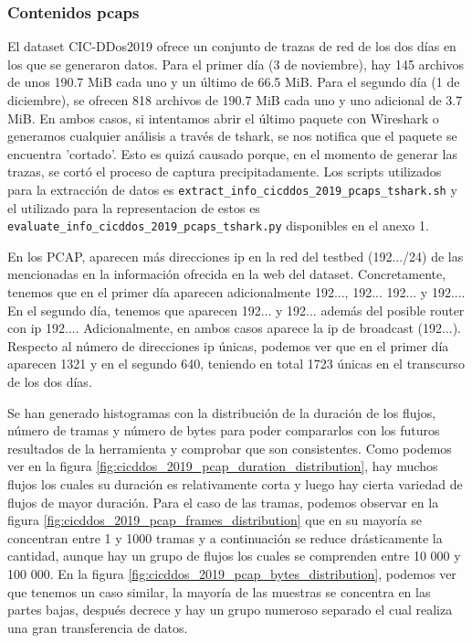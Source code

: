 \subsubsection{Contenidos pcaps}

El dataset CIC-DDos2019 ofrece un conjunto de trazas de red de los dos días en los que se generaron datos. Para el primer día (3 de noviembre), hay 145 archivos de unos 190.7 MiB cada uno y un último de 66.5 MiB. Para el segundo día (1 de diciembre), se ofrecen 818 archivos de 190.7 MiB cada uno y uno adicional de 3.7 MiB. En ambos casos, si intentamos abrir el último paquete con Wireshark o generamos cualquier análisis a través de tshark, se nos notifica que el paquete se encuentra 'cortado'. Esto es quizá causado porque, en el momento de generar las trazas, se cortó el proceso de captura precipitadamente. Los scripts utilizados para la extracción de datos es \texttt{extract\_info\_cicddos\_2019\_pcaps\_tshark.sh} y el utilizado para la representacion de estos es \texttt{evaluate\_info\_cicddos\_2019\_pcaps\_tshark.py} disponibles en el anexo 1.

En los PCAP, aparecen más direcciones \acrshort{ip} en la red del testbed (192.../24) de las mencionadas en la información ofrecida en la web del dataset. Concretamente, tenemos que en el primer día aparecen adicionalmente 192..., 192... 192... y 192.... En el segundo día, tenemos que aparecen 192... y 192... además del posible router con \acrshort{ip} 192.... Adicionalmente, en ambos casos aparece la \acrshort{ip} de broadcast (192...). Respecto al número de direcciones \acrshort{ip} únicas, podemos ver que en el primer día aparecen 1321 y en el segundo 640, teniendo en total 1723 únicas en el transcurso de los dos días. 

Se han generado histogramas con la distribución de la duración de los flujos, número de tramas y número de bytes para poder compararlos con los futuros resultados de la herramienta y comprobar que son consistentes. Como podemos ver en la figura \ref{fig:cicddos_2019_pcap_duration_distribution}, hay muchos flujos los cuales su duración es relativamente corta y luego hay cierta variedad de flujos de mayor duración. Para el caso de las tramas, podemos observar en la figura \ref{fig:cicddos_2019_pcap_frames_distribution} que en su mayoría se concentran entre 1 y 1000 tramas y a continuación se reduce drásticamente la cantidad, aunque hay un grupo de flujos los cuales se comprenden entre 10 000 y 100 000. En la figura \ref{fig:cicddos_2019_pcap_bytes_distribution}, podemos ver que tenemos un caso similar, la mayoría de las muestras se concentra en las partes bajas, después decrece y hay un grupo numeroso separado el cual realiza una gran transferencia de datos.

